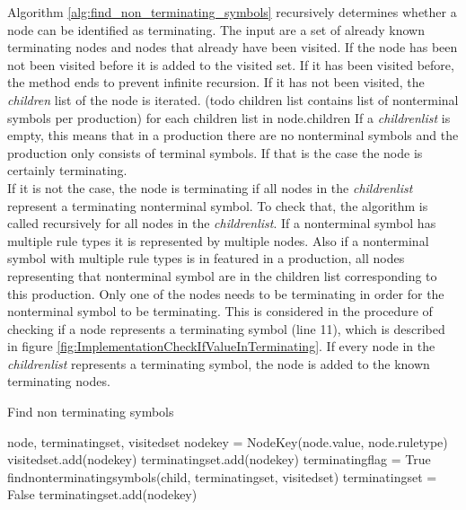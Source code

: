 Algorithm \ref{alg:find_non_terminating_symbols}  recursively determines whether a node can be identified as terminating.
The input are a set of already known terminating nodes and nodes that already have been visited.
If the node has been not been visited before it is added to the visited set.
If it has been visited before, the method ends to prevent infinite recursion.
If it has not been visited, the \textit{children} list of the node is iterated. (todo children list contains list of nonterminal symbols per production)
for each children list in node.children
If a \textit{children\textunderscore list} is empty, this means that in a production there are no nonterminal symbols and the production only consists of terminal symbols. If that is the case the node is certainly terminating.\\
If it is not the case, the node is terminating if all nodes in the \textit{children\textunderscore list} represent a terminating nonterminal symbol.
To check that, the algorithm is called recursively for all nodes in the \textit{children\textunderscore list}.
If a nonterminal symbol has multiple rule types it is represented by multiple nodes. Also if a nonterminal symbol with multiple rule types is in featured in a production, all nodes representing that nonterminal symbol are in the children list corresponding to this production. Only one of the nodes needs to be terminating in order for the nonterminal symbol to be terminating.
This is considered in the procedure of checking if a node represents a terminating symbol (line 11), which is described in figure \ref{fig:ImplementationCheckIfValueInTerminating}.
If every node in the \textit{children\textunderscore list} represents a terminating symbol, the node is added to the known terminating nodes.

\begin{algorithm}[H]
\caption{Find non terminating symbols}
\begin{algorithmic}[1] 
\Require node, terminating\textunderscore set, visited\textunderscore set
\State node\textunderscore key = Node\textunderscore Key(node.value, node.rule\textunderscore type)
	\State visited\textunderscore set.add(node\textunderscore key)
			\State terminating\textunderscore set.add(node\textunderscore key)
		\Else
			\State terminating\textunderscore flag = True
				\State find\textunderscore non\textunderscore terminating\textunderscore symbols(child, terminating\textunderscore set, visited\textunderscore set)		
					\State terminating\textunderscore set = False
				\EndIf
			\EndFor
				\State terminating\textunderscore set.add(node\textunderscore key)
			\EndIf
		\EndIf
	\EndFor
\EndIf
\end{algorithmic}
\label{alg:find_non_terminating_symbols}
\end{algorithm}

